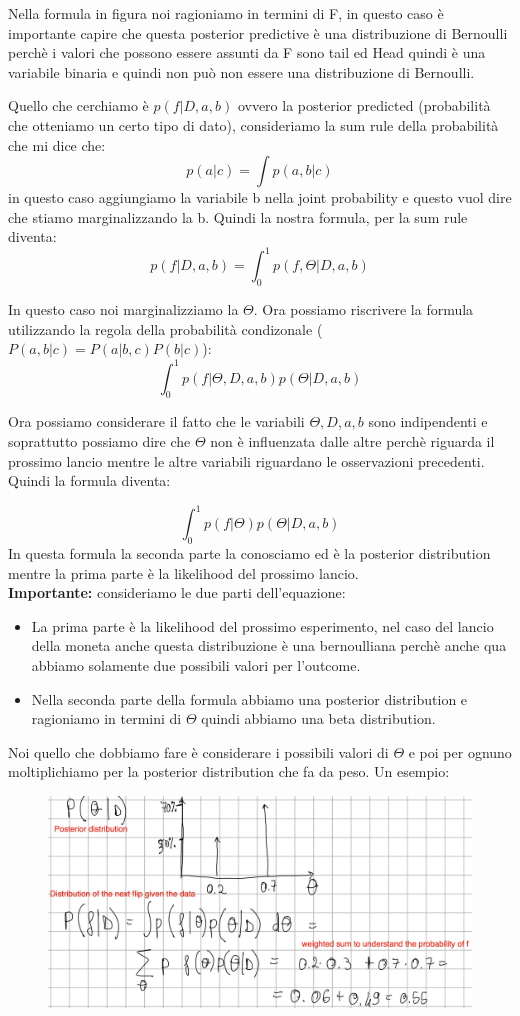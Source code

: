 \documentclass[14pt]{extreport}
\begin{document}
Nella formula in figura noi ragioniamo in termini di F, in questo caso è importante capire che questa posterior predictive è una distribuzione di
Bernoulli perchè i valori che possono essere assunti da F sono tail ed Head quindi è una variabile binaria e quindi non può non essere una
distribuzione di Bernoulli.

Quello che cerchiamo è $p(f|D, a,b)$ ovvero la posterior predicted (probabilità che otteniamo un certo tipo di dato), consideriamo la sum rule della
probabilità che mi dice che:
$$p(a|c) = \int p(a,b|c)$$ in questo caso aggiungiamo la variabile b nella joint probability e questo vuol dire che stiamo marginalizzando la b.
Quindi la nostra formula, per la sum rule diventa: $$p(f|D, a,b) = \int_0^1p(f,\Theta|D,a,b)$$

In questo caso noi marginalizziamo la $\Theta$. Ora possiamo riscrivere la formula utilizzando la regola della probabilità condizonale ($P(a,b|c) =
P(a|b,c)P(b|c)$):
$$\int_0^1p(f|\Theta,D,a,b)p(\Theta|D,a,b)$$

Ora possiamo considerare il fatto che le variabili $\Theta,D,a,b$ sono indipendenti e soprattutto possiamo dire che $\Theta$ non è influenzata dalle
altre perchè riguarda il prossimo lancio mentre le altre variabili riguardano le osservazioni precedenti. Quindi la formula diventa:

 $$\int_0^1p(f|\Theta)p(\Theta|D,a,b)$$ In questa formula la seconda parte la conosciamo ed è la posterior distribution mentre la prima parte è la
 likelihood del prossimo lancio. \\
\textbf{Importante:} consideriamo le due parti dell'equazione:
\begin{itemize}
\item La prima parte è la likelihood del prossimo esperimento, nel caso del lancio della moneta anche questa distribuzione è una bernoulliana perchè
anche qua abbiamo solamente due possibili valori per l'outcome.
\item Nella seconda parte della formula abbiamo una posterior distribution e ragioniamo in termini di $\Theta$ quindi abbiamo una beta distribution.
\end{itemize} 


Noi quello che dobbiamo fare è considerare i possibili valori di $\Theta$ e poi per ognuno moltiplichiamo per la posterior distribution che fa da
peso. Un esempio:
\begin{figure}[H]
\centering
\includegraphics[width=0.7\linewidth]{49.jpeg}
\end{figure}
\end{document}
